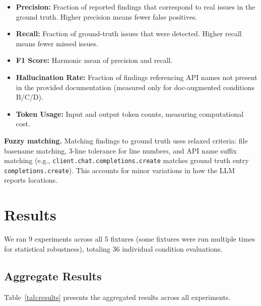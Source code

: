 \documentclass[sigconf,nonacm]{acmart}
\begin{document}
\begin{itemize}
    \item \textbf{Precision:} Fraction of reported findings that correspond to real issues in the ground truth. Higher precision means fewer false positives.
    \item \textbf{Recall:} Fraction of ground-truth issues that were detected. Higher recall means fewer missed issues.
    \item \textbf{F1 Score:} Harmonic mean of precision and recall.
    \item \textbf{Hallucination Rate:} Fraction of findings referencing API names not present in the provided documentation (measured only for doc-augmented conditions B/C/D).
    \item \textbf{Token Usage:} Input and output token counts, measuring computational cost.
\end{itemize}

\textbf{Fuzzy matching.} Matching findings to ground truth uses relaxed criteria: file basename matching, 3-line tolerance for line numbers, and API name suffix matching (e.g., \texttt{client.chat.completions.create} matches ground truth entry \texttt{completions.create}). This accounts for minor variations in how the LLM reports locations.

\section{Results}
\label{sec:results}

We ran 9 experiments across all 5 fixtures (some fixtures were run multiple times for statistical robustness), totaling 36 individual condition evaluations.

\subsection{Aggregate Results}

Table~\ref{tab:results} presents the aggregated results across all experiments.
\end{document}
